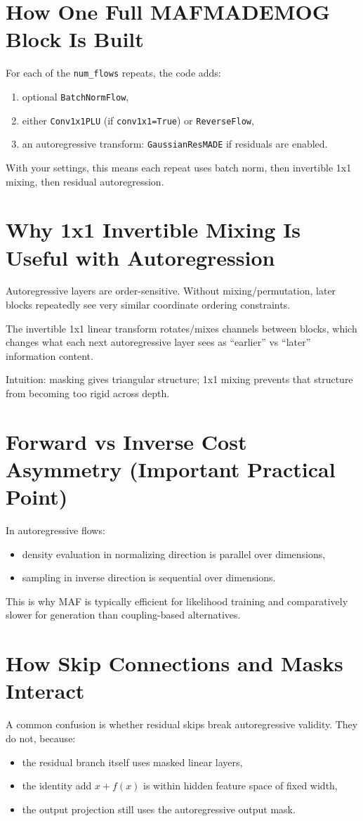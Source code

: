 \documentclass[11pt]{article}
\begin{document}
\section{How One Full MAFMADEMOG Block Is Built}
For each of the \texttt{num\_flows} repeats, the code adds:
\begin{enumerate}[leftmargin=*]
\item optional \texttt{BatchNormFlow},
\item either \texttt{Conv1x1PLU} (if \texttt{conv1x1=True}) or \texttt{ReverseFlow},
\item an autoregressive transform: \texttt{GaussianResMADE} if residuals are enabled.
\end{enumerate}

With your settings, this means each repeat uses batch norm, then invertible
1x1 mixing, then residual autoregression.

\section{Why 1x1 Invertible Mixing Is Useful with Autoregression}
Autoregressive layers are order-sensitive. Without mixing/permutation, later
blocks repeatedly see very similar coordinate ordering constraints.

The invertible 1x1 linear transform rotates/mixes channels between blocks,
which changes what each next autoregressive layer sees as ``earlier'' vs
``later'' information content.

Intuition: masking gives triangular structure; 1x1 mixing prevents that
structure from becoming too rigid across depth.

\section{Forward vs Inverse Cost Asymmetry (Important Practical Point)}
In autoregressive flows:
\begin{itemize}[leftmargin=*]
\item density evaluation in normalizing direction is parallel over dimensions,
\item sampling in inverse direction is sequential over dimensions.
\end{itemize}

This is why MAF is typically efficient for likelihood training and comparatively
slower for generation than coupling-based alternatives.

\section{How Skip Connections and Masks Interact}
A common confusion is whether residual skips break autoregressive validity.
They do not, because:
\begin{itemize}[leftmargin=*]
\item the residual branch itself uses masked linear layers,
\item the identity add $x + f(x)$ is within hidden feature space of fixed width,
\item the output projection still uses the autoregressive output mask.
\end{itemize}
\end{document}
